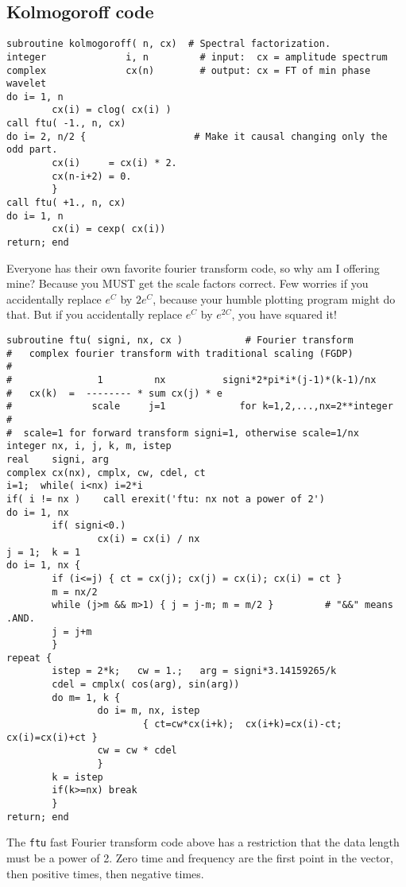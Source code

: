 \subsection{Kolmogoroff code}
\footnotesize
\begin{verbatim}
subroutine kolmogoroff( n, cx)  # Spectral factorization.
integer              i, n         # input:  cx = amplitude spectrum
complex              cx(n)        # output: cx = FT of min phase wavelet
do i= 1, n                     
        cx(i) = clog( cx(i) )
call ftu( -1., n, cx)
do i= 2, n/2 {                   # Make it causal changing only the odd part.
        cx(i)     = cx(i) * 2.
        cx(n-i+2) = 0.
        }
call ftu( +1., n, cx)
do i= 1, n
        cx(i) = cexp( cx(i))
return; end
\end{verbatim}
\normalsize
\par\noindent
Everyone has their own favorite fourier transform code, so why am I offering mine?
Because you MUST get the scale factors correct.
Few worries if you accidentally replace $e^C$ by $2e^C$,
because your humble plotting program might do that.
But if you accidentally replace $e^C$ by $e^{2C}$,
you have squared it!
\par
\footnotesize
\begin{verbatim}
subroutine ftu( signi, nx, cx )	          # Fourier transform
#   complex fourier transform with traditional scaling (FGDP)
#
#               1         nx          signi*2*pi*i*(j-1)*(k-1)/nx
#   cx(k)  =  -------- * sum cx(j) * e
#              scale     j=1             for k=1,2,...,nx=2**integer
#
#  scale=1 for forward transform signi=1, otherwise scale=1/nx
integer nx, i, j, k, m, istep
real    signi, arg
complex cx(nx), cmplx, cw, cdel, ct
i=1;  while( i<nx) i=2*i
if( i != nx )    call erexit('ftu: nx not a power of 2')
do i= 1, nx
        if( signi<0.)
                cx(i) = cx(i) / nx
j = 1;  k = 1
do i= 1, nx {
        if (i<=j) { ct = cx(j); cx(j) = cx(i); cx(i) = ct }
        m = nx/2
        while (j>m && m>1) { j = j-m; m = m/2 }         # "&&" means .AND.
        j = j+m
        }
repeat {
        istep = 2*k;   cw = 1.;   arg = signi*3.14159265/k
        cdel = cmplx( cos(arg), sin(arg))
        do m= 1, k {
                do i= m, nx, istep
                        { ct=cw*cx(i+k);  cx(i+k)=cx(i)-ct;  cx(i)=cx(i)+ct }
                cw = cw * cdel
                }
        k = istep
        if(k>=nx) break
        }
return; end
\end{verbatim}
\normalsize
\par\noindent
The \texttt{ftu} fast Fourier transform code above
has a restriction that the data length must be a power of 2.
Zero time and frequency are the first point in the vector,
then positive times, then negative times.

